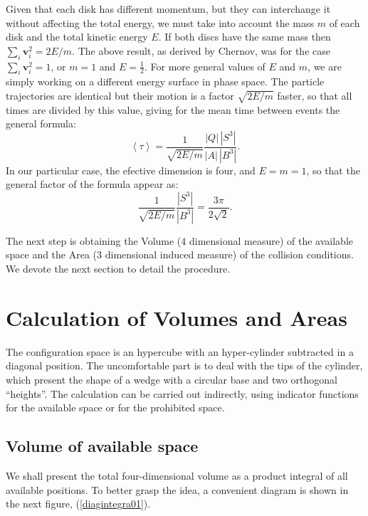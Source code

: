 \documentclass[a4paper,10pt, jcp, aps, preprint]{revtex4-1}
\newcommand{\mean}[1]{\left \langle #1 \right \rangle}
\newcommand{\vv}{\mathbf{v}}
\begin{document}
Given that each disk has different momentum, but
they can interchange it without affecting the
total energy, we must take into account the mass $m$ of each disk 
and the total kinetic energy $E$.
If both discs have the same mass then $\sum_i \vv_i^2 = 2E / m$.
The above result, as derived by Chernov, 
was for the case $\sum_i \vv_i^2 = 1$, or $m=1$ and $E=\frac{1}{2}$.  
For more general values of $E$ and $m$, 
we are simply working on a different energy surface in phase space. 
The particle trajectories are identical but their motion is a factor
$\sqrt{2E/m}$ faster, so that all times are divided by this value, 
giving for
the mean time between events the general formula:
\begin{equation} \label{meantimegeneral}
  \mean{\tau} =  \frac{1}{\sqrt{2E / m}} 
\frac{|Q| \, |S^3|} {|A| \, |B^3|}.	
\end{equation}
In our particular case, the efective dimension is four,
and $E=m=1$, so that the general factor of the formula appear as:
\begin{equation} \label{meantimegeneral}
   \frac{1}{\sqrt{2E / m}} 
\frac{|S^3|}{|B^3|}=\frac{3\pi}{2\sqrt{2}}.	 
\end{equation}

The next step is obtaining the Volume (4 dimensional measure) of
the available space and the Area (3 dimensional induced measure) of
the collision conditions. We devote the next section to
detail the procedure.


\section{Calculation of Volumes and Areas}

The configuration
space is an hypercube with an hyper-cylinder subtracted in a diagonal position.
The uncomfortable part is to deal with the tips of the cylinder, which
present the  shape of a wedge with a circular base and two 
orthogonal ``heights''. 
The calculation can be carried out indirectly, using indicator functions for the
available space or for the  prohibited space.

\subsection{Volume of available space}

We shall present the total four-dimensional volume as a product integral
of all available positions. To better grasp the idea, a convenient
diagram is shown in the next figure, (\ref{diagintegra01}).
\end{document}
